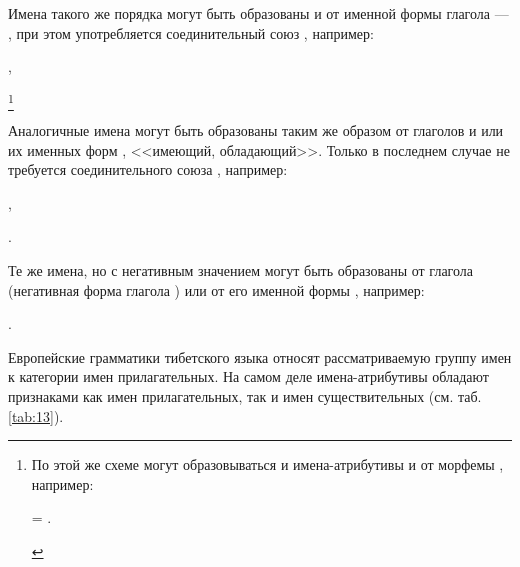 Имена такого же порядка могут быть образованы и от именной формы глагола  --- , при этом употребляется соединительный союз , например:
\begin{prfsample}
    \item {},
    \item {}\footnote[31]{По этой же схеме могут образовываться и имена-атрибутивы и от морфемы , например:
    \begin{prfsample}
        \item {} = .
    \end{prfsample}
    }
\end{prfsample}

Аналогичные имена могут быть образованы таким же образом от глаголов  и  или их именных форм ,  <<имеющий, обладающий>>. Только в последнем случае не требуется соединительного союза , например:
\begin{prfsample}
    \item {},
    \item {}.
\end{prfsample}

Те же имена, но с негативным значением могут быть образованы от глагола  (негативная форма глагола ) или от его именной формы , например: 
\begin{prfsample}
    \item {}.
\end{prfsample}

Европейские грамматики тибетского языка относят рассматриваемую группу имен к категории имен прилагательных. На самом деле имена-атрибутивы обладают признаками как имен прилагательных, так и имен существительных (см. таб. \ref{tab:13}).

